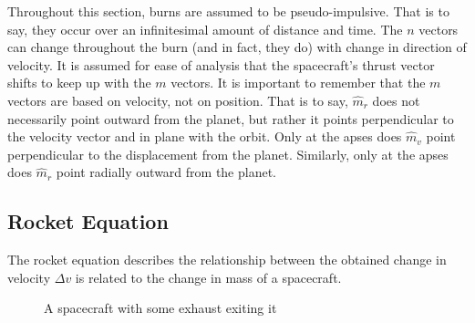 \documentclass[../basicOrbitalDynamics.tex]{subfiles}
\begin{document}
Throughout this section, burns are assumed to be pseudo-impulsive. That is to say, they occur over an infinitesimal amount of distance and time. The $n$ vectors can change throughout the burn (and in fact, they do) with change in direction of velocity. It is assumed for ease of analysis that the spacecraft's thrust vector shifts to keep up with the $m$ vectors. It is important to remember that the $m$ vectors are based on velocity, not on position. That is to say, $\hat{m}_r$ does not necessarily point outward from the planet, but rather it points perpendicular to the velocity vector and in plane with the orbit. Only at the apses does $\hat{m}_v$ point perpendicular to the displacement from the planet. Similarly, only at the apses does $\hat{m}_r$ point radially outward from the planet.

\bigskip\bigskip
\subsection{Rocket Equation}

The rocket equation describes the relationship between the obtained change in velocity $\Delta{}v$ is related to the change in mass of a spacecraft.

\begin{figure}[H]
    \centering

    \bigskip


    \caption{A spacecraft with some exhaust exiting it}
\end{figure}
\end{document}
